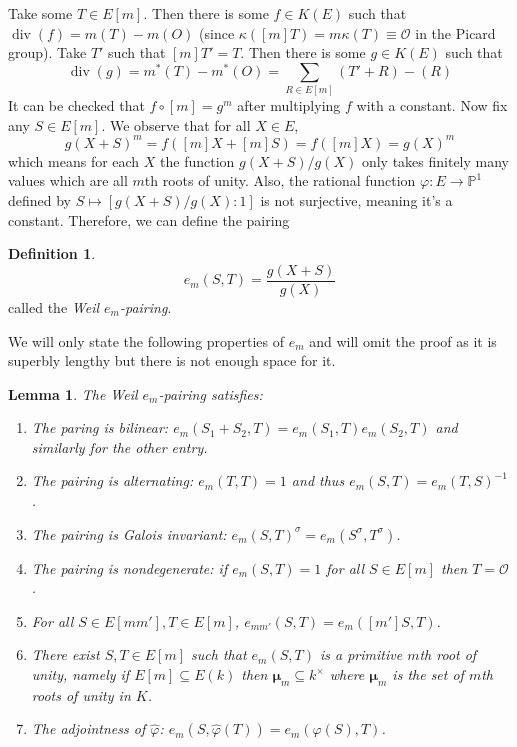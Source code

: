 \documentclass[12pt]{article}
\newtheorem{lemma}{Lemma}[subsection]
\theoremstyle{remark}
\theoremstyle{definition}
\newtheorem{definition}{Definition}[subsection]
\newcommand{\s}[0]{\sigma}
\newcommand{\ecO}[0]{\mathcal O}
\newcommand{\Pc}{\mathbb{P}}   %
\newcommand{\kp}[0]{\kappa}
\newcommand{\pdiv}[0]{\operatorname{div}}
\begin{document}
            Take some $T\in E[m]$. Then there is some $f\in K(E)$ such that $\pdiv(f)=m(T)-m(O)$ (since $\kp([m]T)=m\kp(T)\equiv\ecO$ in the Picard group). Take $T'$ such that $[m]T'=T$. Then there is some $g\in K(E)$ such that
            \[\pdiv(g)=m^*(T)-m^*(O)=\sum_{R\in E[m]}(T'+R)-(R)\]
            It can be checked that $f\circ[m]=g^m$ after multiplying $f$ with a constant. Now fix any $S\in E[m]$. We observe that for all $X\in E$,
            \[g(X+S)^m=f([m]X+[m]S)=f([m]X)=g(X)^m\]
            which means for each $X$ the function $g(X+S)/g(X)$ only takes finitely many values which are all $m$th roots of unity. Also, the rational function $\varphi:E\to \Pc^1$ defined by $S\mapsto[g(X+S)/g(X):1]$ is not surjective, meaning it's a constant. Therefore, we can define the pairing
            \begin{definition}
                \[e_m(S, T)=\frac{g(X+S)}{g(X)}\]
                called the \textit{Weil $e_m$-pairing}.
            \end{definition}
            We will only state the following properties of $e_m$ and will omit the proof as it is superbly lengthy but there is not enough space for it.
            \begin{lemma}\label{lemma-weil-pairing-prop}
                The Weil $e_m$-pairing satisfies:
                \begin{enumerate}[\normalfont(i)]
                    \item The paring is bilinear: $e_m(S_1+S_2,T)=e_m(S_1,T)e_m(S_2, T)$ and similarly for the other entry.
                    \item The pairing is alternating: $e_m(T, T)=1$ and thus $e_m(S, T)=e_m(T, S)^{-1}$.
                    \item The pairing is Galois invariant: $e_m(S, T)^\s=e_m(S^\s, T^\s)$.
                    \item The pairing is nondegenerate: if $e_m(S, T)=1$ for all $S\in E[m]$ then $T=\ecO$.
                    \item For all $S\in E[mm'], T\in E[m]$, $e_{mm'}(S, T)=e_m([m']S, T)$.
                    \item There exist $S, T\in E[m]$ such that $e_m(S, T)$ is a primitive $m$th root of unity, namely if $E[m]\subseteq E(k)$ then $\boldsymbol{\mu}_m\subseteq k^\times$ where $\boldsymbol{\mu}_m$ is the set of $m$th roots of unity in $K$.
                    \item The adjointness of $\hat\varphi$: $e_m(S, \hat\varphi(T))=e_m(\varphi(S), T)$.
                \end{enumerate}
            \end{lemma}
\end{document}
